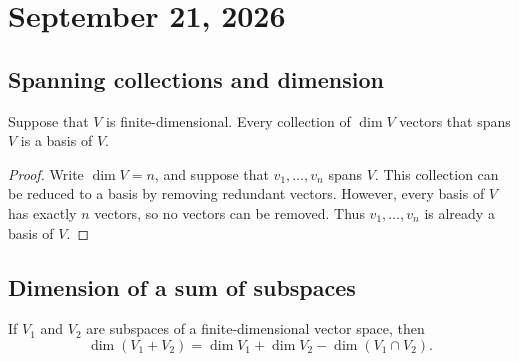 \section{September 21, 2026}

\subsection{Spanning collections and dimension}

\begin{proposition}\label{prop:spanning-dim-is-basis}
  Suppose that $V$ is finite-dimensional. Every collection of
  $\dim V$ vectors that spans $V$ is a basis of $V$.
\end{proposition}

\begin{proof}
  Write $\dim V=n$, and suppose that $v_1,\ldots,v_n$ spans $V$.
  This collection can be reduced to a basis by removing redundant
  vectors. However, every basis of $V$ has exactly $n$ vectors, so no
  vectors can be removed. Thus $v_1,\ldots,v_n$ is already a basis of
  $V$.
\end{proof}

\subsection{Dimension of a sum of subspaces}

\begin{proposition}\label{prop:dimension-of-sum}
  If $V_1$ and $V_2$ are subspaces of a finite-dimensional vector space,
  then
  \[
    \dim(V_1+V_2)=\dim V_1+\dim V_2-\dim(V_1\cap V_2).
  \]
\end{proposition}


